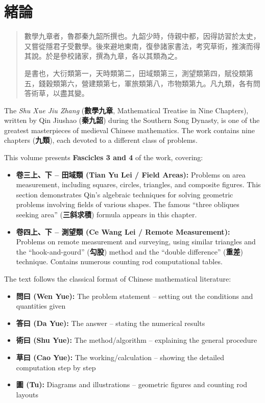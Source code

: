 \documentclass[11pt,a4paper]{article}
\begin{document}
\section*{緒論}

\begin{quote}
{\color{chinacolor}%
數學九章者，魯郡秦九韶所撰也。九韶少時，侍親中都，因得訪習於太史，又嘗從隱君子受數學。後來避地東南，復參諸家書法，考究草術，推演而得其說。於是參校諸家，撰為九章，各以其類為之。

是書也，大衍類第一，天時類第二，田域類第三，測望類第四，賦役類第五，錢穀類第六，營建類第七，軍旅類第八，市物類第九。凡九類，各有問答術草，以盡其變。
}
\end{quote}

The \textit{Shu Xue Jiu Zhang} (\textbf{數學九章}, Mathematical Treatise in Nine Chapters), 
written by Qin Jiushao (\textbf{秦九韶}) during the Southern Song Dynasty, 
is one of the greatest masterpieces of medieval Chinese mathematics. The work 
contains nine chapters (\textbf{九類}), each devoted to a different class of problems.

This volume presents \textbf{Fascicles 3 and 4} of the work, covering:

\begin{itemize}
  \item \textbf{卷三上、下 -- 田域類 (Tian Yu Lei / Field Areas):} Problems on area measurement, 
    including squares, circles, triangles, and composite figures. This section 
    demonstrates Qin's algebraic techniques for solving geometric problems 
    involving fields of various shapes. The famous ``three obliques seeking area'' 
    (\textbf{三斜求積}) formula appears in this chapter.
  
  \item \textbf{卷四上、下 -- 測望類 (Ce Wang Lei / Remote Measurement):} Problems on remote 
    measurement and surveying, using similar triangles and the ``hook-and-gourd'' 
    (\textbf{勾股}) method and the ``double difference'' (\textbf{重差}) technique. 
    Contains numerous counting rod computational tables.
\end{itemize}

The text follows the classical format of Chinese mathematical literature:
\begin{itemize}
  \item \textbf{問曰 (Wen Yue):} The problem statement -- setting out the conditions and quantities given
  \item \textbf{答曰 (Da Yue):} The answer -- stating the numerical results
  \item \textbf{術曰 (Shu Yue):} The method/algorithm -- explaining the general procedure
  \item \textbf{草曰 (Cao Yue):} The working/calculation -- showing the detailed computation step by step
  \item \textbf{圖 (Tu):} Diagrams and illustrations -- geometric figures and counting rod layouts
\end{itemize}
\end{document}
